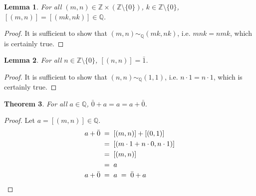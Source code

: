 \documentclass[10pt]{article}
\newtheorem{theorem}{Theorem}[section]
\newtheorem{lemma}[theorem]{Lemma}
\theoremstyle{definition}
\theoremstyle{remark}
\newcommand{\Z}{\mathbb{Z}}
\newcommand{\Q}{\mathbb{Q}}
\newcommand{\Zm}{\Z\times(\Z\setminus\{0\})}
\newcommand{\simQ}{\sim_{\Q}}
\begin{document}
        
        \begin{lemma}
                For all $(m, n) \in \Zm$, $k \in \Z\setminus\{0\}$,
                $[(m, n)] = [(mk, nk)] \in \Q$.
        \end{lemma}
        \begin{proof}
                It is sufficient to show that $(m, n) \simQ (mk, nk)$, i.e.
                $mnk = nmk$, which is certainly true.
        \end{proof}
        \begin{lemma}
                For all $n \in \Z\setminus\{0\}$, $[(n, n)] = \bar{1}$.
        \end{lemma}
        \begin{proof}
                It is sufficient to show that $(n, n) \simQ (1, 1)$, i.e.
                $n\cdot 1 = n\cdot 1$, which is certainly true.
        \end{proof}

        \begin{theorem}
                For all $a \in \Q$, $\bar{0} + a = a = a + \bar{0}$.
        \end{theorem}
        \begin{proof}
                Let $a = [(m, n)] \in \Q$.
                \begin{align*}
                        a + \bar{0} \;&=\; [(m, n)] + [(0, 1)] \\
                                \;&=\; [(m \cdot 1 + n\cdot 0, n \cdot 1)] \\
                                \;&=\; [(m, n)] \\
                                \;&=\; a \\
                        a + \bar{0} \;&=\; a \;=\; \bar{0} + a \qedhere
                \end{align*}
        \end{proof}
        
\end{document}
